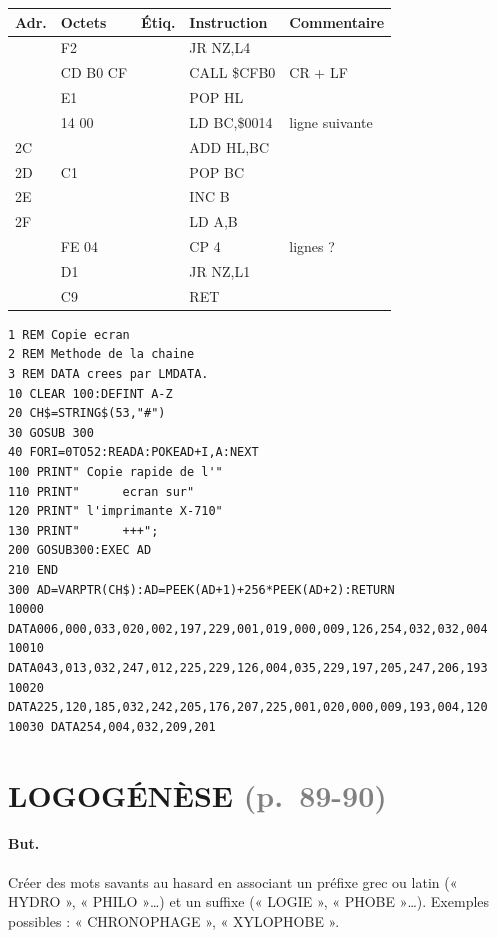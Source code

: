 \documentclass[a4paper,10pt]{article}
\makeatletter
\newcommand{\pg}[1]{\texorpdfstring{\textcolor{gray}{\small(p.~#1)}}{}}
\newenvironment{asm}
  {\small\begin{longtable}{@{}>{\ttfamily}l>{\ttfamily}l>{\ttfamily}l>{\ttfamily}l>{\raggedright\arraybackslash}p{6.2cm}@{}}
   \toprule
   \normalfont\bfseries Adr. & \normalfont\bfseries Octets & \normalfont\bfseries Étiq. & \normalfont\bfseries Instruction & \textbf{Commentaire}\\
   \midrule\endhead
   \bottomrule\endfoot}
  {\end{longtable}}
\makeatother
\begin{document}
\begin{asm}
23 & 20 F2    & & JR NZ,L4       & \\
25 & CD B0 CF & & CALL \$CFB0    & CR + LF \\
28 & E1       & & POP HL         & \\
29 & 01 14 00 & & LD BC,\$0014   & ligne suivante \\
2C & 09       & & ADD HL,BC      & \\
2D & C1       & & POP BC         & \\
2E & 04       & & INC B          & \\
2F & 78       & & LD A,B         & \\
30 & FE 04    & & CP 4           & 4 lignes ? \\
32 & 20 D1    & & JR NZ,L1       & \\
34 & C9       & & RET            & \\
\end{asm}
\begin{verbatim}
1 REM Copie ecran
2 REM Methode de la chaine
3 REM DATA crees par LMDATA.
10 CLEAR 100:DEFINT A-Z
20 CH$=STRING$(53,"#")
30 GOSUB 300
40 FORI=0TO52:READA:POKEAD+I,A:NEXT
100 PRINT" Copie rapide de l'"
110 PRINT"      ecran sur"
120 PRINT" l'imprimante X-710"
130 PRINT"      +++";
200 GOSUB300:EXEC AD
210 END
300 AD=VARPTR(CH$):AD=PEEK(AD+1)+256*PEEK(AD+2):RETURN
10000 DATA006,000,033,020,002,197,229,001,019,000,009,126,254,032,032,004
10010 DATA043,013,032,247,012,225,229,126,004,035,229,197,205,247,206,193
10020 DATA225,120,185,032,242,205,176,207,225,001,020,000,009,193,004,120
10030 DATA254,004,032,209,201
\end{verbatim}

\section{LOGOGÉNÈSE \pg{89-90}}\label{sec:logo}

\paragraph{But.} Créer des mots savants au hasard en associant un préfixe
grec ou latin (« HYDRO », « PHILO »\dots) et un suffixe (« LOGIE »,
« PHOBE »\dots). Exemples possibles : « CHRONOPHAGE », « XYLOPHOBE ».
\end{document}
